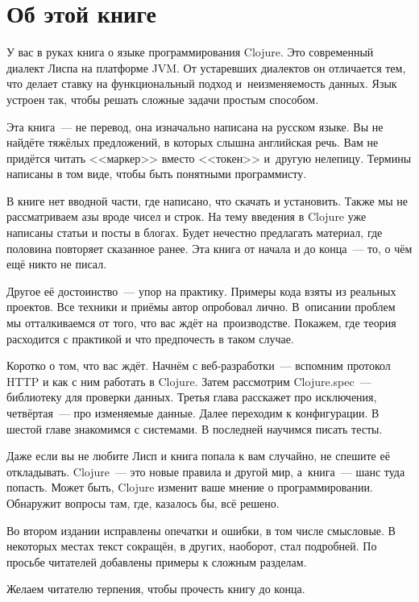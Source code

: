 
\section*{Об этой книге}

У вас в руках книга о языке программирования Clojure. Это современный диалект
Лиспа на платформе JVM. От устаревших диалектов он отличается тем, что делает
ставку на функциональный подход и~неизменяемость данных. Язык устроен так, чтобы
решать сложные задачи простым способом.

Эта книга~--- не перевод, она изначально написана на русском языке. Вы не найдёте
тяжёлых предложений, в которых слышна английская речь. Вам не придётся читать
<<маркер>> вместо <<токен>> и~другую нелепицу. Термины написаны в том виде,
чтобы быть понятными программисту.

В книге нет вводной части, где написано, что скачать и установить. Также мы не
рассматриваем азы вроде чисел и строк. На тему введения в Clojure уже написаны
статьи и посты в блогах. Будет нечестно предлагать материал, где половина
повторяет сказанное ранее. Эта книга от начала и до конца~--- то, о чём ещё
никто не писал.

Другое её достоинство~--- упор на практику. Примеры кода взяты из реальных
проектов. Все техники и приёмы автор опробовал лично. В~описании проблем мы
отталкиваемся от того, что вас ждёт на~производстве. Покажем, где теория
расходится с практикой и что предпочесть в таком случае.

Коротко о том, что вас ждёт. Начнём с веб-разработки~--- вспомним протокол HTTP
и как с ним работать в Clojure. Затем рассмотрим Clojure.spec~--- библиотеку для
проверки данных. Третья глава расскажет про исключения, четвёртая~--- про
изменяемые данные. Далее переходим к конфигурации. В шестой главе знакомимся с
системами. В последней научимся писать тесты.

Даже если вы не любите Лисп и книга попала к вам случайно, не спешите её
откладывать. Clojure~--- это новые правила и другой мир, а~книга~--- шанс туда
попасть. Может быть, Clojure изменит ваше мнение о программировании. Обнаружит
вопросы там, где, казалось бы, всё решено.

Во втором издании исправлены опечатки и ошибки, в том числе смысловые. В
некоторых местах текст сокращён, в других, наоборот, стал подробней. По просьбе
читателей добавлены примеры к сложным разделам.

Желаем читателю терпения, чтобы прочесть книгу до конца.

